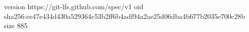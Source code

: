 version https://git-lfs.github.com/spec/v1
oid sha256:ee47e434d430a529364c53b2ff6b4adf94a2ae25d06dba4b677b2035e700c28b
size 885
